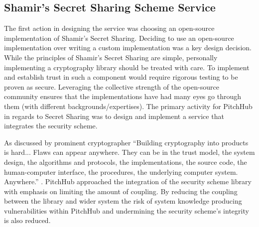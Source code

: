 \subsection{Shamir's Secret Sharing Scheme Service}\label{SS:design_shamir_secret_sharing_service}
The first action in designing the service was choosing an open-source implementation of Shamir's Secret Sharing. Deciding to use an open-source implementation over writing a custom implementation was a key design decision. While the principles of Shamir's Secret Sharing are simple, personally implementing a cryptography library should be treated with care. To implement and establish trust in such a component would require rigorous testing to be proven as secure. Leveraging the collective strength of the open-source community ensures that the implementations have had many eyes go through them (with different backgrounds/expertises). The primary activity for PitchHub in regards to Secret Sharing was to design and implement a service that integrates the security scheme.
\par
As discussed by prominent cryptographer \citeauthor{schneier1999cryptography} ``Building cryptography into products is hard... Flaws can appear anywhere. They can be in the trust model, the system design, the algorithms and protocols, the implementations, the source code, the human-computer interface, the procedures, the underlying computer system. Anywhere.'' \cite{schneier1999cryptography}. PitchHub approached the integration of the security scheme library with emphasis on limiting the amount of coupling. By reducing the coupling between the library and wider system the risk of system knowledge producing vulnerabilities within PitchHub and undermining the security scheme's integrity is also reduced.
\par
